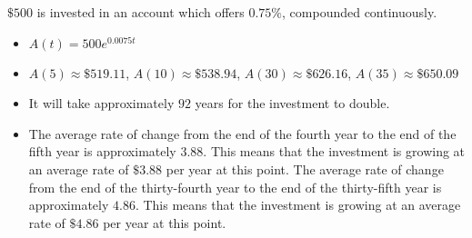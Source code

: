 {$\$500$ is invested in an account which offers $0.75 \%$, compounded continuously.}
{\begin{itemize}  \item $A(t) = 500e^{0.0075t}$ 

\item $A(5) \approx \$ 519.11$, $A(10) \approx \$ 538.94$, $A(30) \approx \$ 626.16$, $A(35) \approx \$ 650.09$ 

\item It will take approximately $92$ years for the investment to double.

\item  The average rate of change from the end of the fourth year to the end of the fifth year is approximately $3.88$.  This means that the investment is growing at an average rate of $\$3.88$ per year at this point.  The average rate of change from the end of the thirty-fourth year to the end of the thirty-fifth year is approximately $4.86$.  This means that the investment is growing at an average rate of $\$4.86$ per year at this point. 

\end{itemize}}